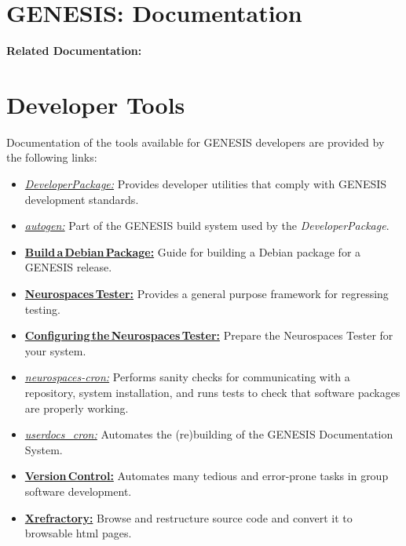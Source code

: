 \documentclass[12pt]{article}
\begin{document}
\section*{GENESIS: Documentation}

{\bf Related Documentation:}

\section*{Developer Tools}

Documentation of the tools available for GENESIS developers are provided by the following links:

\begin{itemize}
   \item[]\href{../developer-package/developer-package.tex}{\it DeveloperPackage:} Provides developer utilities that comply with GENESIS development standards.
   \item[]\href{../autogen/autogen.tex}{\it autogen:} Part of the GENESIS build system used by the {\it DeveloperPackage}.
   \item[]\href{../build-debian/build-debian.tex}{\bf Build\,a\,Debian\,Package:} Guide for building a Debian package for a GENESIS release.
   \item[]\href{../neurospaces-tester/neurospaces-tester.tex}{\bf Neurospaces\,Tester:} Provides a general purpose framework for regressing testing. 
   \item[]\href{../tester-configuration/tester-configuration.tex}{\bf Configuring\,the\,Neurospaces\,Tester:} Prepare the Neurospaces Tester for your system.
   \item[]\href{../neurospaces-cron/neurospaces-cron.tex}{\it neurospaces-cron:} Performs sanity checks for communicating with a repository, system installation, and runs tests to check that software packages are properly working.
   \item[]\href{../userdocs-cron/userdocs-cron.tex}{\it userdocs\_cron:} Automates the (re)building of the GENESIS Documentation System.
   \item[]\href{../version-control/version-control.tex}{\bf Version\,Control:} Automates many tedious and error-prone tasks in group software development.
   \item[]\href{../cxref/cxref.tex}{\bf Xrefractory:} Browse and restructure source code and convert it to browsable html pages. 

\end{itemize}
\end{document}
